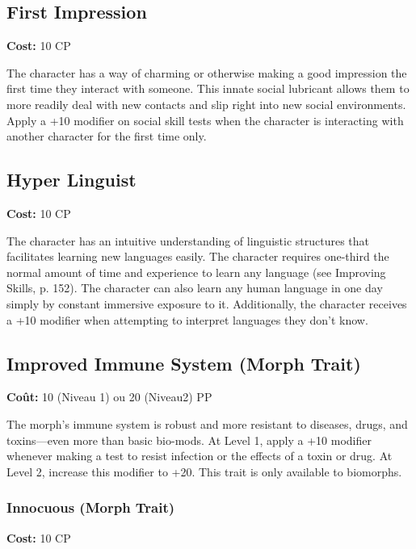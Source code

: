 \subsection{First Impression} \label{sec:traits-first-impression} 

\textbf{Cost:} 10 CP 

The character has a way of charming or otherwise making a good impression the first time they interact with someone. This innate social lubricant allows them to more readily deal with new contacts and slip right into new social environments. Apply a +10 modifier on social skill tests when the character is interacting with another character for the first time only. 

\subsection{Hyper Linguist} \label{sec:traits-hyper-linguist} 

\textbf{Cost:} 10 CP 

The character has an intuitive understanding of linguistic structures that facilitates learning new languages easily. The character requires one-third the normal amount of time and experience to learn any language (see Improving Skills, p. 152). The character can also learn any human language in one day simply by constant immersive exposure to it. Additionally, the character receives a +10 modifier when attempting to interpret languages they don’t know. 

\subsection{Improved Immune System (Morph Trait)} \label{sec:traits-improved-immune-system} 

\textbf{Coût:} 10 (Niveau 1) ou 20 (Niveau2) PP 

The morph’s immune system is robust and more resistant to diseases, drugs, and toxins—even more than basic bio-mods. At Level 1, apply a +10 modifier whenever making a test to resist infection or the effects of a toxin or drug. At Level 2, increase this modifier to +20. This trait is only available to biomorphs. 

\subsubsection{Innocuous (Morph Trait)} \label{sec:traits-innocuous} 

\textbf{Cost:} 10 CP 


